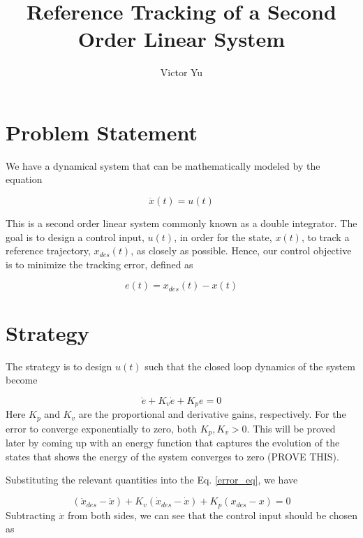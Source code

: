 \documentclass{article}
\author{Victor Yu}
\title{Reference Tracking of a Second Order Linear System}
\begin{document}
	\maketitle
	
	\section{Problem Statement}
	We have a dynamical system that can be mathematically modeled by the equation
	
	\begin{equation}
	{\ddot{x}(t) = u(t)} \label{double_int_eq}
	\end{equation}
	
	This is a second order linear system commonly known as a double integrator. The goal is to design a control input, $u(t)$, in order for the state, $x(t)$, to track a reference trajectory, $x_{des}(t)$, as closely as possible. Hence, our control objective is to minimize the tracking error, defined as
	
	\begin{equation}
	{e(t) = x_{des}(t) - x(t)}
	\end{equation}
	
	\section{Strategy}
	
	The strategy is to design $u(t)$ such that the closed loop dynamics of the system become
	
	\begin{equation} \label{error_eq}
	\ddot{e} + K_v\dot{e} + K_pe = 0
	\end{equation}
	Here $K_p$ and $K_v$ are the proportional and derivative gains, respectively. For the error to converge exponentially to zero, both $K_p, K_v > 0$. This will be proved later by coming up with an energy function that captures the evolution of the states that shows the energy of the system converges to zero (PROVE THIS).
	
	Substituting the relevant quantities into the Eq. \ref{error_eq}, we have
	
	\begin{equation} \label{error_eq_full}
	(\ddot{x}_{des} - \ddot{x}) + K_v(\dot{x}_{des} - \dot{x}) + K_p(x_{des} - x) = 0
	\end{equation}
	Subtracting $\ddot{x}$ from both sides, we can see that the control input should be chosen as
	
\end{document}
